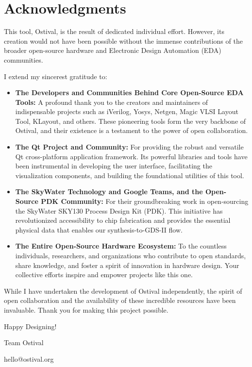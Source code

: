 \chapter*{Acknowledgments}

This tool, Ostival, is the result of dedicated individual effort. However, its creation would not have been possible without the immense contributions of the broader open-source hardware and Electronic Design Automation (EDA) communities.

I extend my sincerest gratitude to:

\begin{itemize}
    \item \textbf{The Developers and Communities Behind Core Open-Source EDA Tools:} A profound thank you to the creators and maintainers of indispensable projects such as iVerilog, Yosys, Netgen, Magic VLSI Layout Tool, KLayout, and others. These pioneering tools form the very backbone of Ostival, and their existence is a testament to the power of open collaboration.
    \item \textbf{The Qt Project and Community:} For providing the robust and versatile Qt cross-platform application framework. Its powerful libraries and tools have been instrumental in developing the user interface, facilitating the visualization components, and building the foundational utilities of this tool.
    \item \textbf{The SkyWater Technology and Google Teams, and the Open-Source PDK Community:} For their groundbreaking work in open-sourcing the SkyWater SKY130 Process Design Kit (PDK). This initiative has revolutionized accessibility to chip fabrication and provides the essential physical data that enables our synthesis-to-GDS-II flow.
    \item \textbf{The Entire Open-Source Hardware Ecosystem:} To the countless individuals, researchers, and organizations who contribute to open standards, share knowledge, and foster a spirit of innovation in hardware design. Your collective efforts inspire and empower projects like this one.
\end{itemize}

While I have undertaken the development of Ostival independently, the spirit of open collaboration and the availability of these incredible resources have been invaluable. Thank you for making this project possible.


\vfill

Happy Designing!

Team Ostival

hello@ostival.org